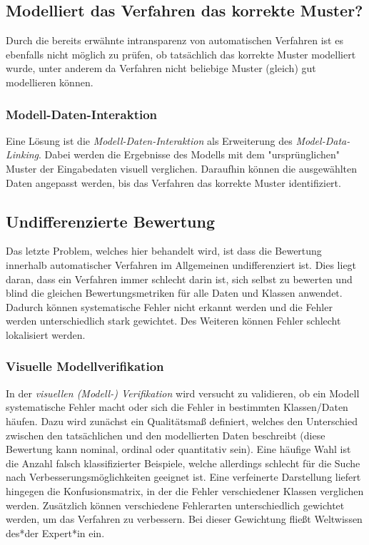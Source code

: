 		\subsection{Modelliert das Verfahren das korrekte Muster?}
			Durch die bereits erwähnte intransparenz von automatischen Verfahren ist es ebenfalls nicht möglich zu prüfen, ob tatsächlich das korrekte Muster modelliert wurde, unter anderem da Verfahren nicht beliebige Muster (gleich) gut modellieren können.

			\subsubsection{Modell-Daten-Interaktion}
				Eine Lösung ist die \emph{Modell-Daten-Interaktion} als Erweiterung des \emph{Model-Data-Linking}. Dabei werden die Ergebnisse des Modells mit dem "ursprünglichen" Muster der Eingabedaten visuell verglichen. Daraufhin können die ausgewählten Daten angepasst werden, bis das Verfahren das korrekte Muster identifiziert.

		\subsection{Undifferenzierte Bewertung}
			Das letzte Problem, welches hier behandelt wird, ist dass die Bewertung innerhalb automatischer Verfahren im Allgemeinen undifferenziert ist. Dies liegt daran, dass ein Verfahren immer schlecht darin ist, sich selbst zu bewerten und blind die gleichen Bewertungsmetriken für alle Daten und Klassen anwendet. Dadurch können systematische Fehler nicht erkannt werden und die Fehler werden unterschiedlich stark gewichtet. Des Weiteren können Fehler schlecht lokalisiert werden.

			\subsubsection{Visuelle Modellverifikation}
				\label{subsubsec:vmv}

				In der \emph{visuellen (Modell-) Verifikation} wird versucht zu validieren, ob ein Modell systematische Fehler macht oder sich die Fehler in bestimmten Klassen/Daten häufen. Dazu wird zunächst ein Qualitätsmaß definiert, welches den Unterschied zwischen den tatsächlichen und den modellierten Daten beschreibt (diese Bewertung kann nominal, ordinal oder quantitativ sein). Eine häufige Wahl ist die Anzahl falsch klassifizierter Beispiele, welche allerdings schlecht für die Suche nach Verbesserungsmöglichkeiten geeignet ist. Eine verfeinerte Darstellung liefert hingegen die Konfusionsmatrix, in der die Fehler verschiedener Klassen verglichen werden. Zusätzlich können verschiedene Fehlerarten unterschiedlich gewichtet werden, um das Verfahren zu verbessern. Bei dieser Gewichtung fließt Weltwissen des*der Expert*in ein.

